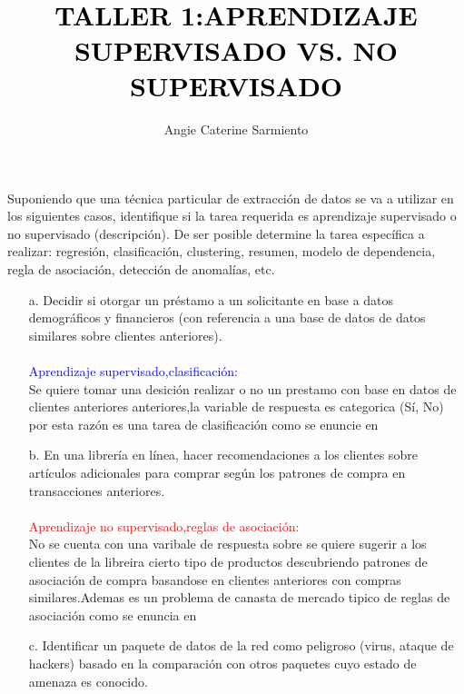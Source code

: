 \documentclass[9pt,letterpaper]{article}\usepackage[]{graphicx}\usepackage[]{color}
\date{}
\author{Angie Caterine Sarmiento}
\title{\textcolor{black}{\bf{ \\ \\  \\ TALLER 1:APRENDIZAJE SUPERVISADO VS. NO SUPERVISADO}}}%
\begin{document}
\maketitle
{}
Suponiendo que una técnica particular de extracción de datos se va a utilizar en los siguientes casos,
identifique si la tarea requerida es aprendizaje supervisado o no supervisado (descripción). De ser
posible determine la tarea específica a realizar: regresión, clasificación, clustering, resumen, modelo
de dependencia, regla de asociación, detección de anomalías, etc.

\begin{enumerate}
    \item[a.]   Decidir si otorgar un préstamo a un solicitante en base a datos demográficos y financieros (con
referencia a una base de datos de datos similares sobre clientes anteriores).
\\ \\
\textcolor{blue}{Aprendizaje supervisado,clasificación:} \\
Se quiere tomar una desición realizar o no un prestamo con base en datos de clientes anteriores anteriores,la variable de respuesta es categorica (Sí, No) por esta razón es una tarea de clasificación como se enuncie en \cite{ramos_aprendizaje_2019}
        \item[b.] En una librería en línea, hacer recomendaciones a los clientes sobre artículos adicionales para
comprar según los patrones de compra en transacciones anteriores.
\\ \\
\textcolor{red}{Aprendizaje no supervisado,reglas de asociación:} \\ No se cuenta con una varibale de respuesta sobre se quiere sugerir a los clientes de la libreira cierto tipo de productos descubriendo patrones de asociación de compra basandose en clientes anteriores con compras similares.Ademas es un problema de canasta de mercado tipico de reglas de asociación como se enuncia en \cite{timaran_pereira_descubrimiento_2016}
            \item[c.] Identificar un paquete de datos de la red como peligroso (virus, ataque de hackers) basado en la
comparación con otros paquetes cuyo estado de amenaza es conocido.
\\ \\

\end{enumerate}
\end{document}
